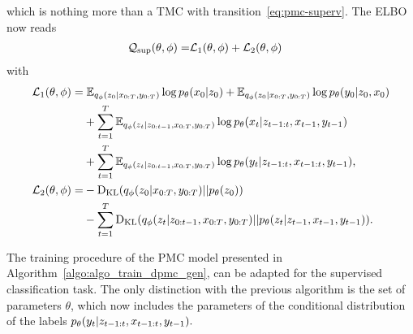 which is nothing more than a TMC with transition~\eqref{eq:pmc-superv}.
The ELBO now reads 
\begin{align}
    \label{eq:elbo_sup_pmc}
    \mathcal{Q}_{\mathrm{sup}}(\theta,\phi) =& \mathcal{L}_1(\theta,\phi) +  \mathcal{L}_2(\theta,\phi)
\end{align}
with 
\begin{align*}
    \mathcal{L}_1(\theta,\phi) =& \;  {\mathbb{E}}_{q_\phi(z_0| x_{0:T}, y_{0:T} )} 
    \log p_{\theta}(x_0| z_0) 
    + {\mathbb{E}}_{q_\phi(z_0| x_{0:T}, y_{0:T} )} 
    \log p_{\theta}(y_0 |z_0, x_0) 
    \\ &+  
    \sum_{t=1}^T {\mathbb{E}}_{q_\phi(z_t|z_{0:t-1},x_{0:T}, y_{0:T})}
    \log p_{\theta}(x_t|z_{t-1:t}, x_{t-1},y_{t-1} )
    \text{}\\
    &+  
    \sum_{t=1}^T {\mathbb{E}}_{q_\phi(z_t|z_{0:t-1},x_{0:T}, y_{0:T})}
    \log p_{\theta}(y_{t}|z_{t-1:t}, x_{t-1:t},y_{t-1}) \text{,}\\
    \mathcal{L}_2(\theta,\phi) =& - \mathrm{D}_{\mathrm{KL}}(q_\phi(z_0| x_{0:T}, y_{0:T} ) | |  p_{\theta}(z_0)) \\
    &- \sum_{t=1}^T  \mathrm{D}_{\mathrm{KL}}(q_\phi(z_t|z_{0:t-1},x_{0:T}, y_{0:T}) 
    | | p_{\theta}(z_t|z_{t-1}, x_{t-1},y_{t-1})) \text{.}
\end{align*}

The training procedure of the  PMC model 
presented in Algorithm~\ref{algo:algo_train_dpmc_gen}, 
can be adapted for the supervised classification task.
The only distinction with the previous algorithm is the set of parameters $\theta$,     
which now includes the parameters of the conditional distribution of the labels 
$p_{\theta}(y_t|z_{t-1:t}, x_{t-1:t},y_{t-1}).$

   
